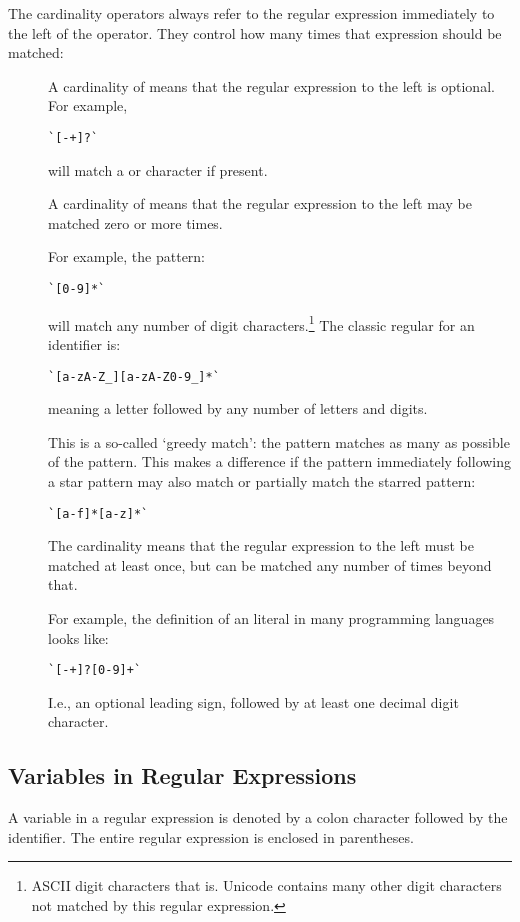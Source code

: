 The cardinality operators always refer to the regular expression immediately to the left of the operator. They control how many times that expression should be matched:
\begin{description}
\item[] A cardinality of  means that the regular expression to the left is optional. For example,
\begin{lstlisting}
`[-+]?`
\end{lstlisting}
will match a \q{-} or \q{+} character if present.
\item[\q{*}]
A cardinality of \q{*} means that the regular expression to the left may be matched zero or more times.

For example, the pattern:
\begin{lstlisting}
`[0-9]*`
\end{lstlisting}
will match any number of digit characters.\footnote{ASCII digit characters that is. Unicode contains many other digit characters not matched by this regular expression.} The classic regular for an identifier is:
\begin{lstlisting}
`[a-zA-Z_][a-zA-Z0-9_]*`
\end{lstlisting}
meaning a letter followed by any number of letters and digits.

\begin{aside}
This is a so-called `greedy match': the pattern matches as many as possible of the pattern. This makes a difference if the pattern immediately following a star pattern may also match or partially match the starred pattern:
\begin{lstlisting}
`[a-f]*[a-z]*`
\end{lstlisting}
\end{aside}
\item[\q{+}] The \q{+} cardinality means that the regular expression to the left must be matched at least once, but can be matched any number of times beyond that.

For example, the definition of an  literal in many programming languages looks like:
\begin{lstlisting}
`[-+]?[0-9]+`
\end{lstlisting}
I.e., an optional leading sign, followed by at least one decimal digit character.
\end{description}

\subsection{Variables in Regular Expressions}
\label{variableRegexp}
A variable in a regular expression is denoted by a colon character followed by the identifier. The entire regular expression is enclosed in parentheses.

